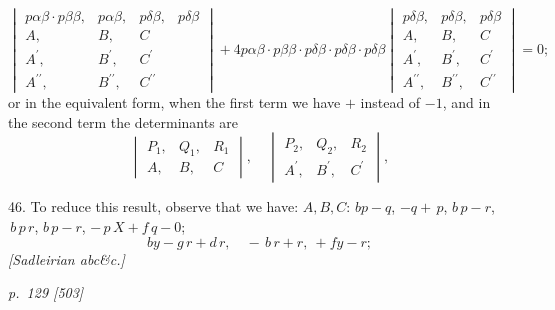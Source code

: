 \documentclass[11pt,a4paper]{book}
\begin{document}
\[
\begin{vmatrix}
p\alpha\beta\cdot p\beta\beta, & p\alpha\beta, & p\delta\beta, & p\delta\beta \\
A, & B, & C \\
A^{\prime}, & B^{\prime}, & C^{\prime} \\
A^{\prime\prime}, & B^{\prime\prime}, & C^{\prime\prime}
\end{vmatrix}
+ 4 p\alpha\beta\cdot p\beta\beta\cdot p\delta\beta\cdot p\delta\beta\cdot p\delta\beta
\begin{vmatrix}
p\delta\beta, & p\delta\beta, & p\delta\beta \\
A, & B, & C \\
A^{\prime}, & B^{\prime}, & C^{\prime} \\
A^{\prime\prime}, & B^{\prime\prime}, & C^{\prime\prime}
\end{vmatrix}
= 0;
\]
or in the equivalent form, when the first term we have $+$ instead of $-1$, and
in the second term the determinants are
\[
\begin{vmatrix}
P_1, & Q_1, & R_1 \\
A, & B, & C
\end{vmatrix},\quad
\begin{vmatrix}
P_2, & Q_2, & R_2 \\
A^{\prime}, & B^{\prime}, & C^{\prime}
\end{vmatrix},
\]

46. To reduce this result, observe that we have:
$A, B, C: \, b p - q$, $-q + \,p$, $b\,p - r$, $\,b\,p\,r$, $b\,p - r$, $-\,p\,X + f\,q - 0$;
\[
b y - g\,r + d \,r, \quad -\,b\,r + r,\ + f y - r;
\]
\textit{[Sadleirian abc\&c.]}

\clearpage

\bigskip
\textit{p.~129 [503]}
\smallskip
\end{document}
